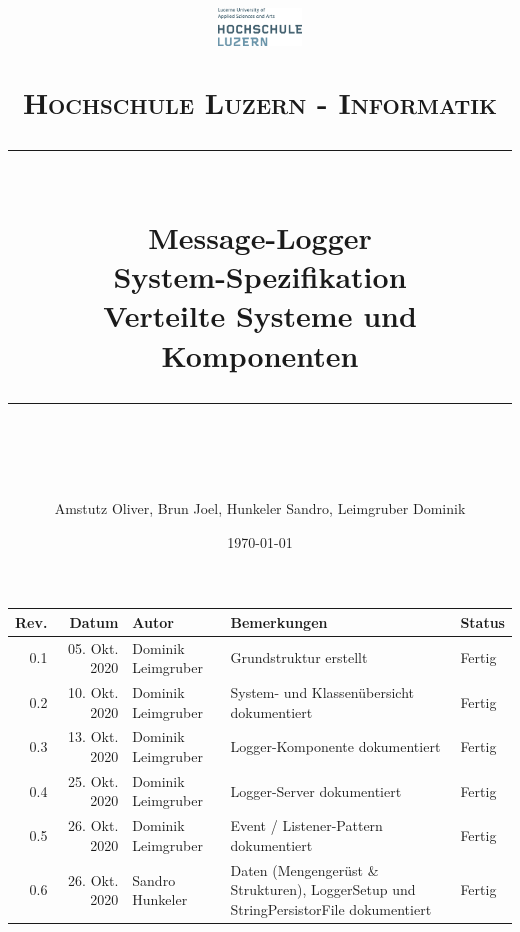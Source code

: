 \documentclass[11pt]{scrartcl} %
\title{	
	\begin{figure}[h]
		\begin{flushright}
			\includegraphics[width=0.2\textwidth]{Bilder/hsluLogo.eps}			
		\end{flushright}
	\end{figure}
	\vspace{10pt} %
	\normalfont\normalsize
	\textsc{Hochschule Luzern - Informatik}
	\vspace{12pt} %
	\rule{\linewidth}{0.5pt}\\ %
	{\huge Message-Logger}\\
	{\huge System-Spezifikation}\\ %
	\vspace{10pt} %
	{\large Verteilte Systeme und Komponenten }
	\vspace{12pt} %
	\rule{\linewidth}{2pt}\\ %
	\vspace{12pt} %
}
\author{\Large Amstutz Oliver, Brun Joel, Hunkeler Sandro, Leimgruber Dominik} %
\date{\normalsize\today} %
\begin{document}
\thispagestyle{plain}
\maketitle %
\begin{center}
	\begin{tabularx}{\textwidth}{|r|r|l|X|l|}
		\hline
		\textbf{Rev.} & \textbf{Datum} & \textbf{Autor} & \textbf{Bemerkungen} & \textbf{Status}  \\ 
		\hline
		0.1 & 05. Okt. 2020 & Dominik Leimgruber & Grundstruktur erstellt & Fertig \\
		\hline
		0.2 & 10. Okt. 2020 & Dominik Leimgruber & System- und Klassenübersicht dokumentiert & Fertig \\
		\hline
		0.3 & 13. Okt. 2020 & Dominik Leimgruber & Logger-Komponente dokumentiert & Fertig \\
		\hline
		0.4 & 25. Okt. 2020 & Dominik Leimgruber & Logger-Server dokumentiert & Fertig \\
		\hline
		0.5 & 26. Okt. 2020 & Dominik Leimgruber & Event / Listener-Pattern dokumentiert & Fertig \\
		\hline
		0.6 & 26. Okt. 2020 & Sandro Hunkeler & Daten (Mengengerüst \& Strukturen), LoggerSetup und StringPersistorFile dokumentiert & Fertig \\
		\hline
	\end{tabularx}
\end{center}
\newpage
\tableofcontents

\newpage








%


\end{document}
